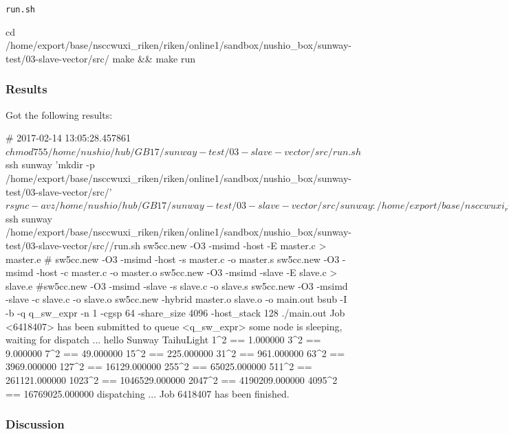 \verb`run.sh`
\begin{code}

cd /home/export/base/nsccwuxi_riken/riken/online1/sandbox/nushio_box/sunway-test/03-slave-vector/src/
make && make run
    
\end{code}

\subsubsection{Results}

Got the following results:

\begin{code}
# 2017-02-14 13:05:28.457861
$ chmod 755 /home/nushio/hub/GB17/sunway-test/03-slave-vector/src/run.sh
$ ssh sunway 'mkdir -p /home/export/base/nsccwuxi_riken/riken/online1/sandbox/nushio_box/sunway-test/03-slave-vector/src/'
$ rsync -avz /home/nushio/hub/GB17/sunway-test/03-slave-vector/src/ sunway:/home/export/base/nsccwuxi_riken/riken/online1/sandbox/nushio_box/sunway-test/03-slave-vector/src/
sending incremental file list
./
Makefile
master.c
param.h
run.sh
slave.c

sent 1,385 bytes  received 117 bytes  429.14 bytes/sec
total size is 2,064  speedup is 1.37
$ ssh sunway /home/export/base/nsccwuxi_riken/riken/online1/sandbox/nushio_box/sunway-test/03-slave-vector/src//run.sh
sw5cc.new -O3 -msimd -host -E master.c > master.e
#	sw5cc.new -O3 -msimd -host -s master.c -o master.s
sw5cc.new -O3 -msimd -host -c master.c -o master.o
sw5cc.new -O3 -msimd -slave -E slave.c > slave.e
#sw5cc.new -O3 -msimd -slave -s slave.c -o slave.s
sw5cc.new -O3 -msimd -slave -c slave.c -o slave.o
sw5cc.new -hybrid  master.o slave.o -o main.out
bsub -I -b -q q_sw_expr -n 1 -cgsp 64 -share_size 4096 -host_stack 128 ./main.out
Job <6418407> has been submitted to queue <q_sw_expr>
some node is sleeping, waiting for dispatch ...
hello Sunway TaihuLight
1^2 == 1.000000
3^2 == 9.000000
7^2 == 49.000000
15^2 == 225.000000
31^2 == 961.000000
63^2 == 3969.000000
127^2 == 16129.000000
255^2 == 65025.000000
511^2 == 261121.000000
1023^2 == 1046529.000000
2047^2 == 4190209.000000
4095^2 == 16769025.000000
dispatching ...
Job 6418407 has been finished.

\end{code}

\subsubsection{Discussion}


